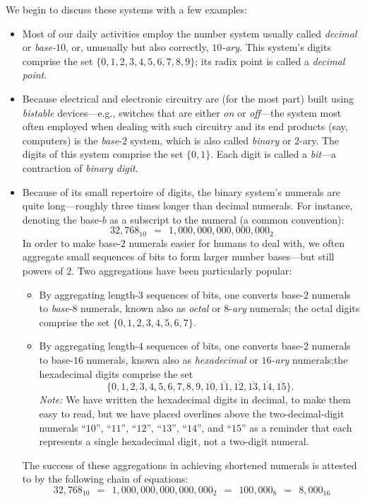 \noindent
We begin to discuss these systems with a few examples:
\begin{itemize}
\item
Most of our daily activities employ the number system usually called {\it decimal} or {\it base-$10$}, or, unusually but also correctly, {\it $10$-ary}.  This system's digits comprise the set $\{0, 1, 2, 3, 4, 5, 6, 7, 8, 9\}$; its radix point is called a {\em decimal point}.
  
 

\medskip\item
Because electrical and electronic circuitry are (for the most part) built using {\it bistable} devices---e.g., switches that are either {\em on} or {\em off}---the system most often employed when dealing with such circuitry and its end products (say, computers) is the {\it base}-$2$ system, which is also called {\it binary} or $2$-ary. The digits of this system comprise the set $\{0, 1\}$.  Each digit is called a {\it bit}---a contraction of {\it binary digit}.
 

\medskip\item
Because of its small repertoire of digits, the binary system's numerals are quite long---roughly three times longer than decimal numerals.  For instance, denoting the base-$b$ as a subscript to the numeral (a common convention):
\[ 32,768_{10} \ \ = \ \ 1,000,000,000,000,000_2 \]
In order to make base-$2$ numerals easier for humans to deal with, we often aggregate small sequences of bits to form larger number bases---but still powers of $2$.  Two aggregations have been particularly popular:
  \begin{itemize}
  \item
By aggregating length-$3$ sequences of bits, one converts base-$2$ numerals to {\it base}-$8$ numerals, known also as {\it octal} or $8$-{\it ary} numerals; the octal digits comprise the set $\{0, 1, 2, 3, 4, 5, 6, 7\}$.  
  \medskip\item
By aggregating length-$4$ sequences of bits, one converts base-$2$ numerals to base-$16$ numerals, known also as {\it hexadecimal} or {\it $16$-ary} numerals;the hexadecimal digits comprise the set 
\[ \{0, 1, 2, 3, 4, 5, 6, 7, 8, 9, \overline{10}, \overline{11}, \overline{12}, \overline{13}, \overline{14}, \overline{15}\}.
\]
{\it Note:} We have written the hexadecimal digits in decimal, to make them easy to read, but we have placed overlines above the two-decimal-digit numerals ``$10$'', ``$11$'', ``$12$'', ``$13$'',
``$14$'', and ``$15$'' as a reminder that each represents a single hexadecimal digit, not a two-digit numeral.    
  \end{itemize}
The success of these aggregations in achieving shortened numerals is attested to by the following chain of equations:
\[ 32,768_{10} \ \ = \ \ 1,000,000,000,000,000_2 \ \ = \ \ 100,000_8 \ \ = \ \ 8,000_{16} \]
\end{itemize}


